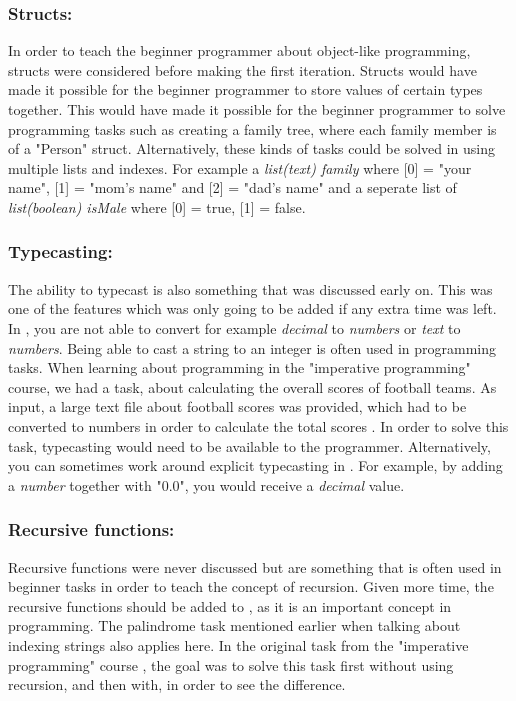 \subsubsection{Structs:} In order to teach the beginner programmer about object-like programming, structs were considered before making the first iteration. Structs would have made it possible for the beginner programmer to store values of certain types together. This would have made it possible for the beginner programmer to solve programming tasks such as creating a family tree, where each family member is of a "Person" struct. Alternatively, these kinds of tasks could be solved in \lang using multiple lists and indexes. For example a \textit{list(text) family} where [0] = "your name", [1] = "mom's name" and [2] = "dad's name" and a seperate list of \textit{list(boolean) isMale} where [0] = true, [1] = false.

\subsubsection{Typecasting:}
 The ability to typecast is also something that was discussed early on. This was one of the features which was only going to be added if any extra time was left. In \lang, you are not able to convert for example \textit{decimal} to \textit{numbers} or \textit{text} to \textit{numbers}. Being able to cast a string to an integer is often used in programming tasks. When learning about programming in the "imperative programming" course, we had a task, about calculating the overall scores of football teams. As input, a large text file about football scores was provided, which had to be converted to numbers in order to calculate the total scores \cite{C-CourseExercises}. In order to solve this task, typecasting would need to be available to the programmer. Alternatively, you can sometimes work around explicit typecasting in \lang. For example, by adding a \textit{number} together with "0.0", you would receive a \textit{decimal} value.

\subsubsection{Recursive functions:} Recursive functions were never discussed but are something that is often used in beginner tasks in order to teach the concept of recursion. Given more time, the recursive functions should be added to \lang, as it is an important concept in programming. The palindrome task mentioned earlier when talking about indexing strings also applies here. In the original task from the "imperative programming" course \cite{C-CourseExercises}, the goal was to solve this task first without using recursion, and then with, in order to see the difference.

